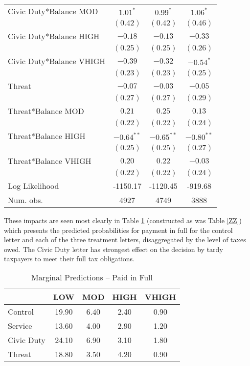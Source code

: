 \documentclass[12pt,titlepage]{article}
\begin{document}
\begin{center}
\begin{longtable}{| l | c |  c| c|}
Civic Duty*Balance MOD   & $1.01^{*}$    & $0.99^{*}$    & $1.06^{*}$    \\
                  & $(0.42)$      & $(0.42)$      & $(0.46)$      \\
Civic Duty*Balance HIGH   & $-0.18$       & $-0.13$       & $-0.33$       \\
                  & $(0.25)$      & $(0.25)$      & $(0.26)$      \\
Civic Duty*Balance VHIGH   & $-0.39$       & $-0.32$       & $-0.54^{*}$   \\
                  & $(0.23)$      & $(0.23)$      & $(0.25)$      \\
Threat            & $-0.07$       & $-0.03$       & $-0.05$       \\
                  & $(0.27)$      & $(0.27)$      & $(0.29)$      \\
Threat*Balance MOD & $0.21$        & $0.25$        & $0.13$        \\
                  & $(0.22)$      & $(0.22)$      & $(0.24)$      \\
Threat*Balance HIGH & $-0.64^{**}$  & $-0.65^{**}$  & $-0.80^{**}$  \\
                  & $(0.25)$      & $(0.25)$      & $(0.27)$      \\
Threat*Balance VHIGH & $0.20$        & $0.22$        & $-0.03$       \\
                  & $(0.22)$      & $(0.22)$      & $(0.24)$      \\
\hline
Log Likelihood    & -1150.17      & -1120.45      & -919.68       \\
Num. obs.         & 4927          & 4749          & 3888          \\
\end{longtable}
\end{center}


These impacts are seen most clearly in Table \ref{TT} (constructed as was Table \ref{ZZ}) which presents the predicted probabilities for payment in full for the control letter and each of the three treatment letters, disaggregated by the level of taxes owed.   The Civic Duty letter has strongest effect on the decision by tardy taxpayers to meet their full tax obligations.   


\begin{table}[htbp]
\caption{Marginal Predictions -- Paid in Full}  \label{TT}
\bigskip
\begin{center}
\begin{tabular}{| l | c | c | c | c |}
  \hline
 & LOW & MOD & HIGH & VHIGH \\ 
  \hline
Control & 19.90 & 6.40 & 2.40 & 0.90 \\ 
  Service & 13.60 & 4.00 & 2.90 & 1.20 \\ 
  Civic Duty & 24.10 & 6.90 & 3.10 & 1.80 \\ 
  Threat & 18.80 & 3.50 & 4.20 & 0.90 \\ 
   \hline
\end{tabular}
\end{center}
\end{table}
\end{document}
